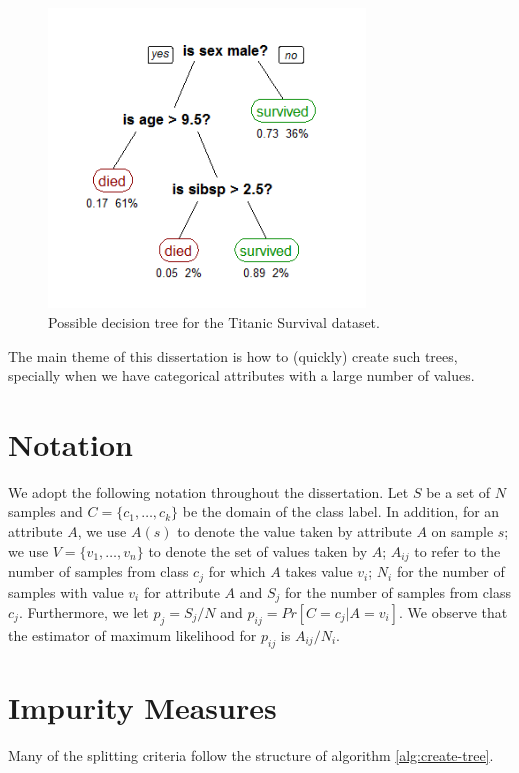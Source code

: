 \begin{figure}[h]
\centering
\includegraphics[width=0.75\textwidth]{titanic-tree}
\caption{Possible decision tree for the Titanic Survival dataset.}
\label{fig:titanic-tree}
\end{figure}

The main theme of this dissertation is how to (quickly) create such trees, specially when we have categorical attributes with a large number of values.

\section{Notation}
\label{sec:notation}
We adopt the following notation throughout the dissertation.
Let $S$ be a set of $N$ samples and 
 $C=\{c_1,\ldots,c_k\}$ be the domain of the class label. 
In addition, for an attribute  $A$, we use $A(s)$ to denote the value taken by attribute
$A$ on sample $s$; we use 
  $V=\{ v_1,\ldots,v_n \}$ to denote the set of values
taken by $A$;
$A_{ij}$ to refer to the  number of samples
from class $c_j$ for which  $A$ takes value $v_i$; 
 $N_i$ for the number of samples with value $v_i$ for attribute $A$
and $S_j$ for the number of samples from class $c_j$.
Furthermore, we let $p_j = S_j /N$ and $p_{ij}= Pr[C=c_j | A = v_i]$.
We observe that the estimator of maximum likelihood for $p_{ij} $ is
$A_{ij} / N_i$.  

\section{Impurity Measures}
Many of the splitting criteria follow the structure of algorithm \ref{alg:create-tree}.

